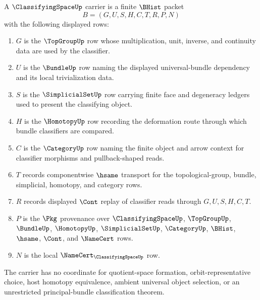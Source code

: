 \begin{definition}
\label{def:classifying-space-carrier}
A $\ClassifyingSpaceUp$ carrier is a finite $\BHist$ packet
$$
B=(G,U,S,H,C,T,R,P,N)
$$
with the following displayed rows:
\begin{enumerate}
\item $G$ is the $\TopGroupUp$ row whose multiplication, unit, inverse, and continuity data are used by the classifier.
\item $U$ is the $\BundleUp$ row naming the displayed universal-bundle dependency and its local trivialization data.
\item $S$ is the $\SimplicialSetUp$ row carrying finite face and degeneracy ledgers used to present the classifying object.
\item $H$ is the $\HomotopyUp$ row recording the deformation route through which bundle classifiers are compared.
\item $C$ is the $\CategoryUp$ row naming the finite object and arrow context for classifier morphisms and pullback-shaped reads.
\item $T$ records componentwise $\hsame$ transport for the topological-group, bundle, simplicial, homotopy, and category rows.
\item $R$ records displayed $\Cont$ replay of classifier reads through $G,U,S,H,C,T$.
\item $P$ is the $\Pkg$ provenance over $\ClassifyingSpaceUp$, $\TopGroupUp$, $\BundleUp$, $\HomotopyUp$, $\SimplicialSetUp$, $\CategoryUp$, $\BHist$, $\hsame$, $\Cont$, and $\NameCert$ rows.
\item $N$ is the local $\NameCert_{\ClassifyingSpaceUp}$ row.
\end{enumerate}
The carrier has no coordinate for quotient-space formation, orbit-representative choice, host homotopy equivalence, ambient universal object selection, or an unrestricted principal-bundle classification theorem.
\end{definition}

